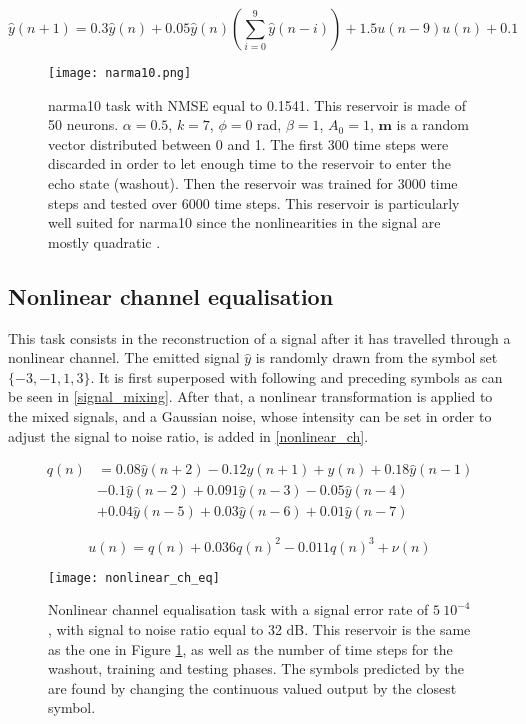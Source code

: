 \begin{equation}
	\hat{y}(n+1) = 0.3\hat{y}(n)+0.05\hat{y}(n)\left(\sum_{i=0}^9 \hat{y}(n-i) \right)+1.5u(n-9)u(n)+0.1
\end{equation}

\begin{figure}[h]
	\centering
	\texttt{[image: narma10.png]}
	\caption{\gls{narma}10 task with NMSE equal to 0.1541. This reservoir is made of 50 neurons. $\alpha=0.5$, $k=7$, $\phi=0$ rad, $\beta=1$, $A_0=1$, $\mathbf{m}$ is a random vector distributed between 0 and 1. The first 300 time steps were discarded in order to let enough time to the reservoir to enter the echo state (washout). Then the reservoir was trained for 3000 time steps and tested over 6000 time steps. This reservoir is particularly well suited for  \gls{narma}10 since the nonlinearities in the signal are mostly quadratic \cite{Vinckier2015}.}
	\label{narma10}
\end{figure}

\subsection{Nonlinear channel equalisation}

This task consists in the reconstruction of a signal after it has travelled through a nonlinear channel. The emitted signal $\hat{y}$ is randomly drawn from the symbol set $\{-3,-1,1,3\}$. It is first superposed with following and preceding symbols as can be seen in \eqref{signal_mixing}. After that, a nonlinear transformation is applied to the mixed signals, and a Gaussian noise, whose intensity can be set in order to adjust the signal to noise ratio, is added in \eqref{nonlinear_ch}. 

\begin{align}
	q(n) &= 0.08\hat{y}(n+2)-0.12\hat{y}(n+1)+\hat{y}(n)+0.18\hat{y}(n-1) \nonumber\\
	&-0.1\hat{y}(n-2)+0.091\hat{y}(n-3)-0.05\hat{y}(n-4) \nonumber\\
	&+0.04\hat{y}(n-5)+0.03\hat{y}(n-6)+0.01\hat{y}(n-7) \label{signal_mixing}
\end{align}

\begin{equation}
	u(n)=q(n)+0.036q(n)^2-0.011q(n)^3+\nu(n)
	\label{nonlinear_ch}
\end{equation}

\begin{figure}[h]
	\centering
	\texttt{[image: nonlinear\_ch\_eq]}
	\caption{Nonlinear channel equalisation task with a signal error rate of $5~10^{-4}$, with signal to noise ratio equal to 32 dB. This reservoir is the same as the one in Figure \ref{narma10}, as well as the number of time steps for the washout, training and testing phases. The symbols predicted by the \rcer are found by changing the continuous valued output by the closest symbol.}
\end{figure}
